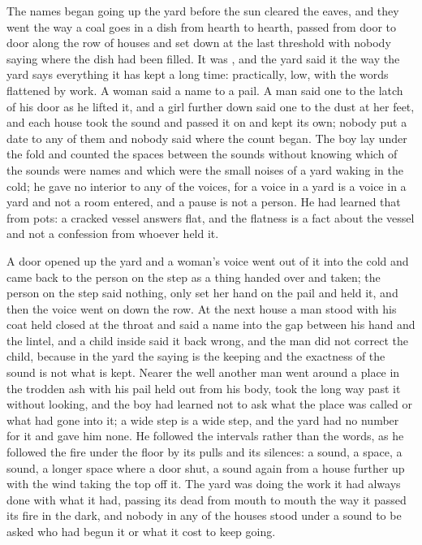 \scenebreak

The names began going up the yard before the sun cleared the eaves, and they went the way a coal goes in a dish from hearth to hearth, passed from door to door along the row of houses and set down at the last threshold with nobody saying where the dish had been filled. It was , and the yard said it the way the yard says everything it has kept a long time: practically, low, with the words flattened by work. A woman said a name to a pail. A man said one to the latch of his door as he lifted it, and a girl further down said one to the dust at her feet, and each house took the sound and passed it on and kept its own; nobody put a date to any of them and nobody said where the count began. The boy lay under the fold and counted the spaces between the sounds without knowing which of the sounds were names and which were the small noises of a yard waking in the cold; he gave no interior to any of the voices, for a voice in a yard is a voice in a yard and not a room entered, and a pause is not a person. He had learned that from pots: a cracked vessel answers flat, and the flatness is a fact about the vessel and not a confession from whoever held it.

A door opened up the yard and a woman's voice went out of it into the cold and came back to the person on the step as a thing handed over and taken; the person on the step said nothing, only set her hand on the pail and held it, and then the voice went on down the row. At the next house a man stood with his coat held closed at the throat and said a name into the gap between his hand and the lintel, and a child inside said it back wrong, and the man did not correct the child, because in the yard the saying is the keeping and the exactness of the sound is not what is kept. Nearer the well another man went around a place in the trodden ash with his pail held out from his body, took the long way past it without looking, and the boy had learned not to ask what the place was called or what had gone into it; a wide step is a wide step, and the yard had no number for it and gave him none. He followed the intervals rather than the words, as he followed the fire under the floor by its pulls and its silences: a sound, a space, a sound, a longer space where a door shut, a sound again from a house further up with the wind taking the top off it. The yard was doing the work it had always done with what it had, passing its dead from mouth to mouth the way it passed its fire in the dark, and nobody in any of the houses stood under a sound to be asked who had begun it or what it cost to keep going.

